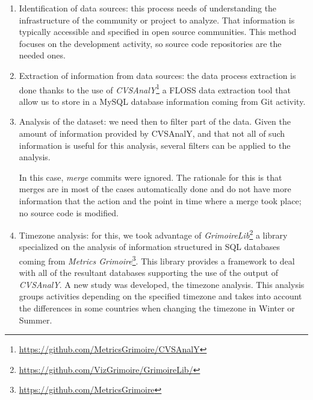 \documentclass{sig-alternate-05-2015}
\begin{document}
\begin{enumerate}
\item Identification of data sources: this process needs of understanding the
infrastructure of the community or project to analyze. That information is
typically accessible and specified in open source communities. This method
focuses on the development activity, so source code repositories are the
needed ones.

\item Extraction of information from data sources: the data process extraction
is done thanks to the use of
\emph{CVSAnalY}\footnote{\url{https://github.com/MetricsGrimoire/CVSAnalY}}
 a FLOSS data extraction tool that allow us to store in a MySQL
database information coming from Git activity.

\item Analysis of the dataset: we need then to filter part of the data.
Given the amount of information provided by CVSAnalY, and that not all of
such information is useful for this analysis, several filters can be applied
to the analysis.

In this case, \emph{merge} commits were ignored. The rationale
for this is that merges are in most of the cases automatically done and do not
have more information that the action and the point in time where a merge took place; no source code is modified.

\item Timezone analysis: for this, we took advantage of
\emph{GrimoireLib}\footnote{\url{https://github.com/VizGrimoire/GrimoireLib/}} a library
specialized on the analysis of information structured in SQL databases coming from
\emph{Metrics Grimoire}\footnote{\url{https://github.com/MetricsGrimoire}}. This library provides
a framework to deal with all of the resultant databases supporting the use of the
output of \emph{CVSAnalY}. A new study was developed, the timezone analysis. This analysis
groups activities depending on the specified timezone and takes into account the
differences in some countries when changing the timezone in Winter or Summer.


\end{enumerate}
\end{document}
